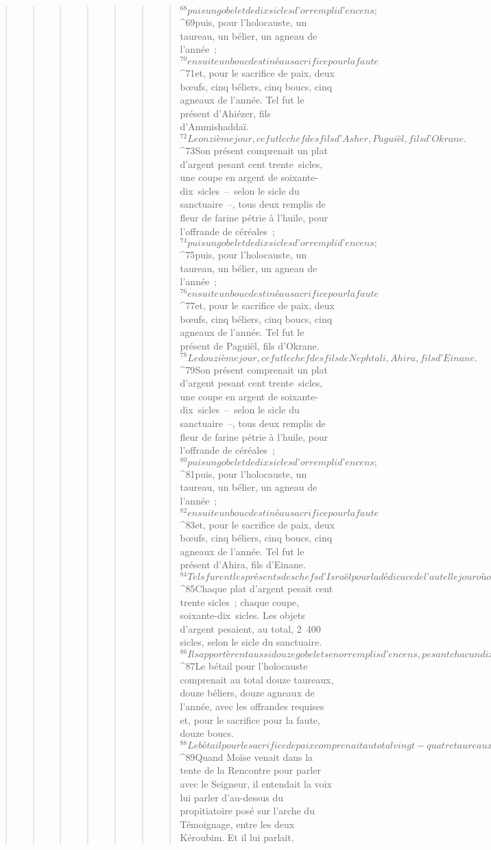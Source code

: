 \begin{verse}
\begin{verse}
\begin{verse}
\begin{verse}
\begin{verse}
\begin{verse}
\begin{verse}
${}^{68}puis un gobelet de dix sicles d’or rempli d’encens ; 
${}^{69}puis, pour l’holocauste, un taureau, un bélier, un agneau de l’année ; 
${}^{70}ensuite un bouc destiné au sacrifice pour la faute 
${}^{71}et, pour le sacrifice de paix, deux bœufs, cinq béliers, cinq boucs, cinq agneaux de l’année. Tel fut le présent d’Ahiézer, fils d’Ammishaddaï.
${}^{72}Le onzième jour, ce fut le chef des fils d’Asher, Paguiël, fils d’Okrane. 
${}^{73}Son présent comprenait un plat d’argent pesant cent trente sicles, une coupe en argent de soixante-dix sicles – selon le sicle du sanctuaire –, tous deux remplis de fleur de farine pétrie à l’huile, pour l’offrande de céréales ; 
${}^{74}puis un gobelet de dix sicles d’or rempli d’encens ; 
${}^{75}puis, pour l’holocauste, un taureau, un bélier, un agneau de l’année ; 
${}^{76}ensuite un bouc destiné au sacrifice pour la faute 
${}^{77}et, pour le sacrifice de paix, deux bœufs, cinq béliers, cinq boucs, cinq agneaux de l’année. Tel fut le présent de Paguiël, fils d’Okrane.
${}^{78}Le douzième jour, ce fut le chef des fils de Nephtali, Ahira, fils d’Einane. 
${}^{79}Son présent comprenait un plat d’argent pesant cent trente sicles, une coupe en argent de soixante-dix sicles – selon le sicle du sanctuaire –, tous deux remplis de fleur de farine pétrie à l’huile, pour l’offrande de céréales ; 
${}^{80}puis un gobelet de dix sicles d’or rempli d’encens ; 
${}^{81}puis, pour l’holocauste, un taureau, un bélier, un agneau de l’année ; 
${}^{82}ensuite un bouc destiné au sacrifice pour la faute 
${}^{83}et, pour le sacrifice de paix, deux bœufs, cinq béliers, cinq boucs, cinq agneaux de l’année. Tel fut le présent d’Ahira, fils d’Einane.
${}^{84}Tels furent les présents des chefs d’Israël pour la dédicace de l’autel le jour où on en fit l’onction : douze plats d’argent, douze coupes en argent, douze gobelets en or. 
${}^{85}Chaque plat d’argent pesait cent trente sicles ; chaque coupe, soixante-dix sicles. Les objets d’argent pesaient, au total, 2 400 sicles, selon le sicle du sanctuaire. 
${}^{86}Ils apportèrent aussi douze gobelets en or remplis d’encens, pesant chacun dix sicles, selon le sicle du sanctuaire. Les gobelets en or pesaient, au total, cent vingt sicles. 
${}^{87}Le bétail pour l’holocauste comprenait au total douze taureaux, douze béliers, douze agneaux de l’année, avec les offrandes requises et, pour le sacrifice pour la faute, douze boucs. 
${}^{88}Le bétail pour le sacrifice de paix comprenait au total vingt-quatre taureaux, soixante béliers, soixante boucs, soixante agneaux de l’année. Telle fut la dédicace de l’autel, après qu’on eut fait l’onction sur lui.
${}^{89}Quand Moïse venait dans la tente de la Rencontre pour parler avec le Seigneur, il entendait la voix lui parler d’au-dessus du propitiatoire posé sur l’arche du Témoignage, entre les deux Kéroubim. Et il lui parlait.
      

\end{verse}
\end{verse}
\end{verse}
\end{verse}
\end{verse}
\end{verse}
\end{verse}
